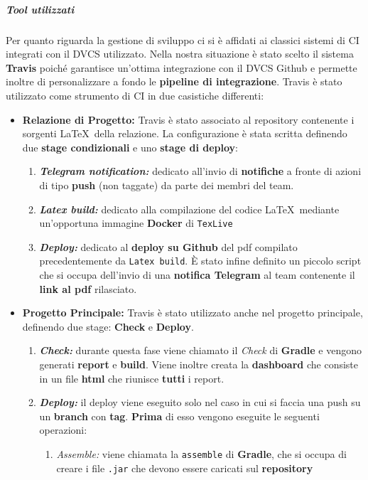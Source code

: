 \subparagraph{Tool utilizzati}
Per quanto riguarda la gestione di sviluppo ci si è affidati ai classici sistemi di CI integrati con il DVCS utilizzato. Nella nostra situazione è stato scelto il sistema \textbf{Travis} poiché garantisce un'ottima integrazione con il DVCS Github e permette inoltre di personalizzare a fondo le \textbf{pipeline di integrazione}. Travis è stato utilizzato come strumento di CI in due casistiche differenti: 
\begin{itemize}
	\item{\textbf{Relazione di Progetto:}}
	Travis è stato associato al repository contenente i sorgenti \LaTeX~della relazione. La configurazione è stata scritta definendo due \textbf{stage condizionali} e uno \textbf{stage di deploy}:
	\begin{enumerate}
	 	\item{\textit{\textbf{Telegram notification:}}}
	 	dedicato all'invio di \textbf{notifiche} a fronte di azioni di tipo \textbf{push} (non taggate) da parte dei membri del team.
	 	\item{\textit{\textbf{Latex build:}}}
	 	dedicato alla compilazione del codice \LaTeX~mediante un'opportuna immagine \textbf{Docker} di \texttt{TexLive}  
	 	\item{\textit{\textbf{Deploy:}}}
	 	dedicato al \textbf{deploy su Github} del pdf compilato precedentemente da \texttt{Latex build}. È stato infine definito un piccolo script che si occupa dell'invio di una \textbf{notifica Telegram} al team contenente il \textbf{link al pdf} rilasciato.
	 \end{enumerate}
	 \item{\textbf{Progetto Principale:}} Travis è stato utilizzato anche nel progetto principale, definendo due stage: \textbf{Check} e \textbf{Deploy}. 
	    \begin{enumerate}
	        \item \textit{\textbf{Check:}} durante questa fase viene chiamato il \textit{Check} di \textbf{Gradle} e vengono generati \textbf{report} e \textbf{build}. Viene inoltre creata la \textbf{dashboard} che consiste in un file \textbf{html} che riunisce \textbf{tutti} i report. 
	        \item \textit{\textbf{Deploy:}} il deploy viene eseguito solo nel caso in cui si faccia una push su un \textbf{branch} con \textbf{tag}. \textbf{Prima} di esso vengono eseguite le seguenti operazioni:
	            \begin{enumerate}
	                \item \textit{Assemble:} viene chiamata la \texttt{assemble} di \textbf{Gradle}, che si occupa di creare i file \texttt{.jar} che devono essere caricati sul \textbf{repository} 

\end{enumerate}
\end{enumerate}
\end{itemize}
